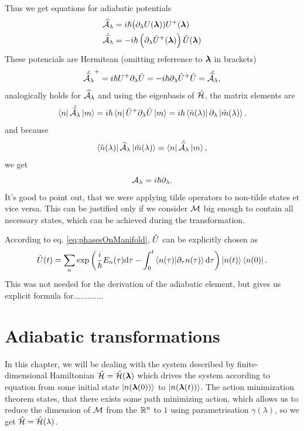 Thus we get equations for adiabatic potentials
\begin{align}
    \AA_\lambda&=i\hbar \big(\partial_\lambda U(\llambda))U^+(\llambda)
    \label{eq:adiabaticPotential}\\
    \tilde{\AA_\lambda} &= -i\hbar\left(\partial_\lambda \U^+(\llambda)\right)\U(\llambda)
    \label{eq:adiabaticPotentialTilde}
\end{align}
These potencials are Hermitean (omitting referrence to $\llambda$ in brackets)
\begin{equation}
     \tilde{\AA_\lambda}^+=i\hbar U^+\partial_\lambda\U=-i\hbar\partial_\lambda\U^+\U = \tilde{\AA_\lambda} ,
\end{equation}
analogically holds for $\AA_\lambda$ and using the eigenbasis of $\HH$, the matrix elements are
\begin{equation}
    \bra{n}\tilde{\AA_\lambda}\ket{m}=i\hbar\bra{n}\U^+\partial_\lambda\U\ket{m} = i\hbar\bra{\tilde n(\lambda)}\partial_\lambda\ket{\tilde m(\lambda)}.
\end{equation}
and because
\begin{equation}
    \bra{\tilde n(\lambda)}\AA_\lambda\ket{\tilde m(\lambda)}= \bra{n}\tilde{\AA_\lambda}\ket{m},
\end{equation}
we get
\begin{equation}
    \A_\lambda = i\hbar\partial_\lambda.
    \label{eq:adiabaticPotentialDefinition}
\end{equation}
It's good to point out, that we were applying tilde operators to non-tilde states et vice versa. This can be justified only if we consider $\M$ big enough to contain all necessary states, which can be achieved during the transformation.


According to eq. \ref{eq:phasesOnManifold}, $\U$ can be explicitly chosen as
\begin{equation}
    \U(t)=\sum_n \exp\left(\frac{i}{\hbar}E_n(\tau)\d \tau - \int_0^t \braket{n(\tau)|\partial_\tau n(\tau)}\d\tau\right)\ket{n(t)}\bra{n(0)}.
\end{equation}
This was not needed for the derivation of the adiabatic element, but gives us explicit formula for.............

\section{Adiabatic transformations}
In this chapter, we will be dealing with the system described by finite-dimensional Hamiltonian $\HH=\HH(\llambda)$ which drives the system according to \Schrodinger equation from some initial state $\ket{n(\llambda(0))}$ to $\ket{n(\llambda(t))}$. The action minimization theorem states, that there exists some path minimizing action, which allows us to reduce the dimension of $\M$ from the $\R^n$ to $1$ using parametrisation $\gamma(\lambda)$, so we get $\HH=\HH(\lambda)$.

